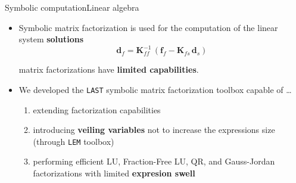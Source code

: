 \begin{frame}{Symbolic computation}{Linear algebra}
  \begin{itemize}
    \item Symbolic matrix factorization is used for the computation of the linear system \textbf{solutions}
    \begin{equation*}
      \mathbf{d}_{f} = \mathbf{K}_{ff}^{-1}\,\left(\mathbf{f}_{f} - \mathbf{K}_{fs}\,\mathbf{d}_{s}\right)
    \end{equation*}
    \begin{bbox}[Problem]
      \Maple matrix factorizations have \textbf{limited capabilities}.
    \end{bbox}
    \item We developed the \texttt{LAST} symbolic matrix factorization toolbox capable of \dots  \\
    \begin{enumerate}
      \item extending \Maple factorization capabilities \\
      \item introducing \textbf{veiling variables} not to increase the expressions size (through \texttt{LEM} toolbox) \\
      \item performing efficient LU, Fraction-Free LU, QR, and Gauss-Jordan factorizations with limited \textbf{expresion swell} \\
    \end{enumerate}
  \end{itemize}
\end{frame}

